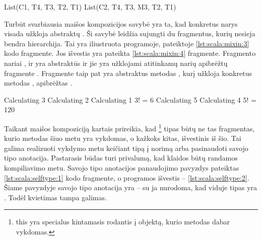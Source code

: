 \begin{listing}[H]
  \caption{Fragmentų hierarchijos modifikavimas.}
  \label{lst:scala:mixin:1}
\end{listing}

\begin{listing}[H]
  \begin{textcode}
    List(C1, T4, T3, T2, T1)
    List(C2, T4, T3, M3, T2, T1)
  \end{textcode}
  \caption{\ref{lst:scala:mixin:1} kodo fragmente pateiktos programos
  išvestis.}
  \label{lst:scala:mixin:2}
\end{listing}

Turbūt svarbiausia maišos kompozicijos savybė yra ta, kad konkretus
narys visada užkloja abstraktų
\cite[6]{scalable-component-abstractions}. Ši savybė leidžia
sujungti du fragmentus, kurių nesieja bendra hierarchija. Tai yra
iliustruota programoje, pateiktoje \ref{lst:scala:mixin:3} kodo
fragmente. Jos išvestis yra pateikta \ref{lst:scala:mixin:4}
fragmente. Fragmento  nariai
,  ir  yra abstraktūs
ir jie yra užklojami atitinkamų narių apibrėžtų fragmente
. Fragmente  taip pat yra
abstraktus metodas , kurį užkloja konkretus metodas
, apibrėžtas .

\begin{listing}[H]
  \caption{Maišos kompozicijos pavyzdys.}
  \label{lst:scala:mixin:3}
\end{listing}

\begin{listing}[H]
  \begin{textcode}
    Calculating 3
    Calculating 2
    Calculating 1
    3! = 6
    Calculating 5
    Calculating 4
    5! = 120
  \end{textcode}
  \caption{\ref{lst:scala:mixin:3} kodo fragmente pateiktos programos
  išvestis.}
  \label{lst:scala:mixin:4}
\end{listing}

Taikant maišos kompoziciją kartais prireikia, kad
\footnote{this yra specialus kintamasis rodantis į
objektą, kurio metodas dabar vykdomas.} tipas būtų ne tas fragmentas,
kurio metodas šiuo metu yra vykdomas, o kažkoks kitas, išvestinis
iš šio. Tai galima realizuoti vykdymo metu keičiant 
tipą į norimą arba pasinaudoti  savojo tipo
anotacija. Pastarasis būdas turi privalumą, kad klaidos būtų randamos
kompiliavimo metu. Savojo tipo anotacijos panaudojimo pavyzdys pateiktas
\ref{lst:scala:selftype:1} kodo fragmente, o programos išvestis
– \ref{lst:scala:selftype:2}. Šiame pavyzdyje savojo tipo anotacija
yra  – su ja nurodoma, kad 
viduje  tipas yra . Todėl kvietimas
 tampa galimas.

